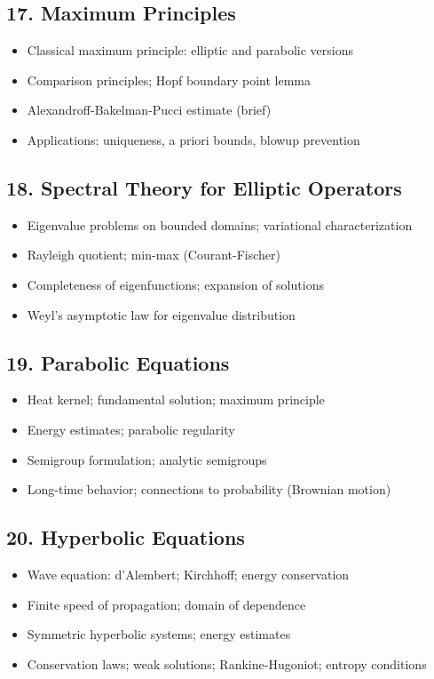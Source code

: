 \subsection{17. Maximum Principles}
\begin{itemize}
\item Classical maximum principle: elliptic and parabolic versions
\item Comparison principles; Hopf boundary point lemma
\item Alexandroff-Bakelman-Pucci estimate (brief)
\item Applications: uniqueness, a priori bounds, blowup prevention
\end{itemize}

\subsection{18. Spectral Theory for Elliptic Operators}
\begin{itemize}
\item Eigenvalue problems on bounded domains; variational characterization
\item Rayleigh quotient; min-max (Courant-Fischer)
\item Completeness of eigenfunctions; expansion of solutions
\item Weyl's asymptotic law for eigenvalue distribution
\end{itemize}

\subsection{19. Parabolic Equations}
\begin{itemize}
\item Heat kernel; fundamental solution; maximum principle
\item Energy estimates; parabolic regularity
\item Semigroup formulation; analytic semigroups
\item Long-time behavior; connections to probability (Brownian motion)
\end{itemize}

\subsection{20. Hyperbolic Equations}
\begin{itemize}
\item Wave equation: d'Alembert; Kirchhoff; energy conservation
\item Finite speed of propagation; domain of dependence
\item Symmetric hyperbolic systems; energy estimates
\item Conservation laws; weak solutions; Rankine-Hugoniot; entropy conditions
\end{itemize}

